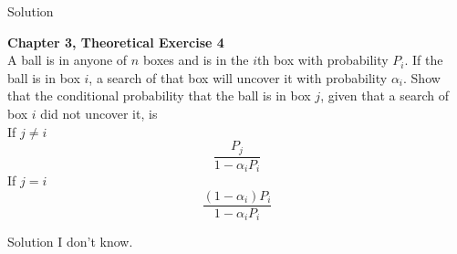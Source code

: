 \documentclass{article}
\begin{document}
\begin{spacing}{1.1}
\begin{homeworkProblem}
\begin{homeworkSection}{Solution}
  \end{homeworkSection}
\end{homeworkProblem}
\begin{comment}
If $E$ and $F$ are mutually exclusive events in an experiment, 
then $P( E \cup F) = P( E) + P( F)$. We desire to compute the probability that $E$ occurs
before $F$ , which we will denote by $p$. To compute $p$ we condition on the
three mutually exclusive events $E$, $F$ , or $(E \cup F )^c$. This last event
are all the outcomes not in $E$ or $F$. Letting the event $A$ be the event
that $E$ occurs before $F$, we have that
\[p = P( A|E) P( E) + P( A|F) P(F ) + P( A|(E \cup F )^c) P( (E \cup F )^c)\] . 

\[P( A|E) = 1\]
\[P( A|F) = 0\] 
\[P( A|(E \cup F)^c) = p\], 

since if neither E or F happen the next
experiment will have $E$ before $F$ (and thus event $A$ with probability $p$).
Thus we have that 

\[p = P( E) + p P( (E \cup F)^c)\]
\[= P( E) + p (1 − P( E \cup F))\]
\[= P( E) + p (1 − P( E) − P( F))\]

Solving for $p$ gives 
\[p = \frac{ P( E)}{ P( E) + P( F)\]
as we were to show. 

\end{comment}
\newpage
\begin{homeworkProblem}
  {\bf Chapter 3, Theoretical Exercise 4}\\
  A ball is in anyone of $n$ boxes and is in the $i$th box with 
  probability $P_i$. If the ball is in box $i$, a search of that 
  box will uncover it with probability $\alpha_i$. Show that the 
  conditional probability that the ball is in box $j$, given that 
  a search of box $i$ did not uncover it, is \\
  If $j \neq i$
    \[\frac{ P_j}{ 1 - \alpha_i P_i}\]
  If $j = i$
    \[\frac{ (1 - \alpha_i) P_i}{ 1 - \alpha_i P_i}\]
  \begin{homeworkSection}{Solution}
      I don't know.
    
  \end{homeworkSection}
\end{homeworkProblem}
\end{spacing}
\end{document}
